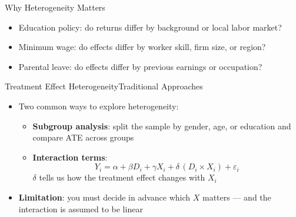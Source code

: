 \documentclass[hyperref={pdfpagelabels=false}]{beamer}
\begin{document}
\begin{frame}{Why Heterogeneity Matters}
\begin{itemize}

  \item Education policy: do returns differ by background or local labor market?
  \vspace{0.2cm}
  \item Minimum wage: do effects differ by worker skill, firm size, or region?
  \vspace{0.2cm}
  \item Parental leave: do effects differ by previous earnings or occupation?
\end{itemize}
\end{frame}


\begin{frame}{Treatment Effect Heterogeneity}{Traditional Approaches}
\begin{itemize}
  \item Two common ways to explore heterogeneity:
  \vspace{0.2cm}
  \begin{itemize}
    \item[1.] \textbf{Subgroup analysis}: split the sample by gender, age, or education and compare ATE across groups
    \vspace{0.15cm}
    \item[2.] \textbf{Interaction terms}:
    \[
      Y_i = \alpha + \beta D_i + \gamma X_i + \delta\,(D_i \times X_i) + \varepsilon_i
    \]
    $\delta$ tells us how the treatment effect changes with $X_i$
  \end{itemize}
  \vspace{0.25cm}
  \item \textbf{Limitation}: you must decide in advance which $X$ matters --- and the interaction is assumed to be linear
\end{itemize}
\end{frame}
\end{document}
